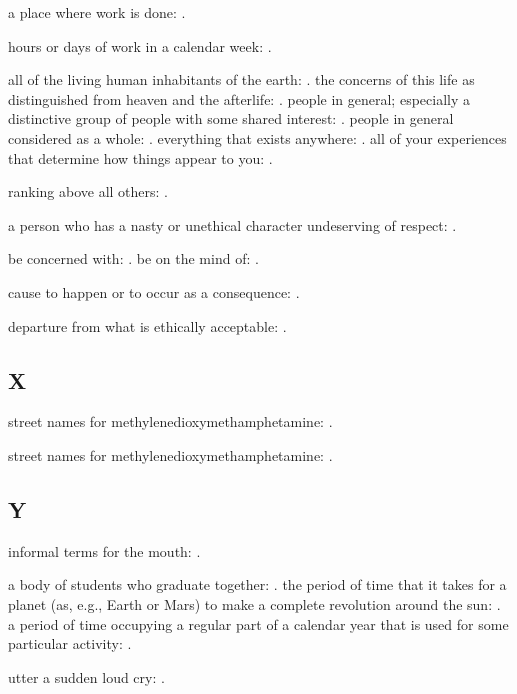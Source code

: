   a place where work is done: .

  hours or days of work in a calendar week: .

  all of the living human inhabitants of the earth: . the concerns of this life as distinguished from heaven and the afterlife: . people in general; especially a distinctive group of people with some shared interest: . people in general considered as a whole: . everything that exists anywhere: . all of your experiences that determine how things appear to you: .

  ranking above all others: .

  a person who has a nasty or unethical character undeserving of respect: .

  be concerned with: . be on the mind of: .

  cause to happen or to occur as a consequence: .

  departure from what is ethically acceptable: .

\subsection*{X}

  street names for methylenedioxymethamphetamine: .

  street names for methylenedioxymethamphetamine: .

\subsection*{Y}

  informal terms for the mouth: .

  a body of students who graduate together: . the period of time that it takes for a planet (as, e.g., Earth or Mars) to make a complete revolution around the sun: . a period of time occupying a regular part of a calendar year that is used for some particular activity: .

  utter a sudden loud cry: .

